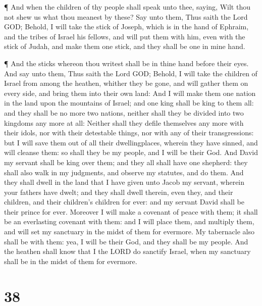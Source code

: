  ¶ And when the children of thy people shall speak unto
thee, saying, Wilt thou not shew us what thou meanest by these?
 Say unto them, Thus saith the Lord GOD; Behold, I will
take the stick of Joseph, which is in the hand of Ephraim, and the
tribes of Israel his fellows, and will put them with him, even with the
stick of Judah, and make them one stick, and they shall be one in mine
hand.

 ¶ And the sticks whereon thou writest shall be in thine
hand before their eyes.  And say unto them, Thus saith the
Lord GOD; Behold, I will take the children of Israel from among the
heathen, whither they be gone, and will gather them on every side, and
bring them into their own land:  And I will make them one
nation in the land upon the mountains of Israel; and one king shall be
king to them all: and they shall be no more two nations, neither shall
they be divided into two kingdoms any more at all:  Neither
shall they defile themselves any more with their idols, nor with their
detestable things, nor with any of their transgressions: but I will save
them out of all their dwellingplaces, wherein they have sinned, and will
cleanse them: so shall they be my people, and I will be their God.
 And David my servant shall be king over them; and they all
shall have one shepherd: they shall also walk in my judgments, and
observe my statutes, and do them.  And they shall dwell in
the land that I have given unto Jacob my servant, wherein your fathers
have dwelt; and they shall dwell therein, even they, and their children,
and their children's children for ever: and my servant David shall be
their prince for ever.  Moreover I will make a covenant of
peace with them; it shall be an everlasting covenant with them: and I
will place them, and multiply them, and will set my sanctuary in the
midst of them for evermore.  My tabernacle also shall be
with them: yea, I will be their God, and they shall be my people.
 And the heathen shall know that I the LORD do sanctify
Israel, when my sanctuary shall be in the midst of them for evermore.

\hypertarget{section-37}{%
\section{38}\label{section-37}}

